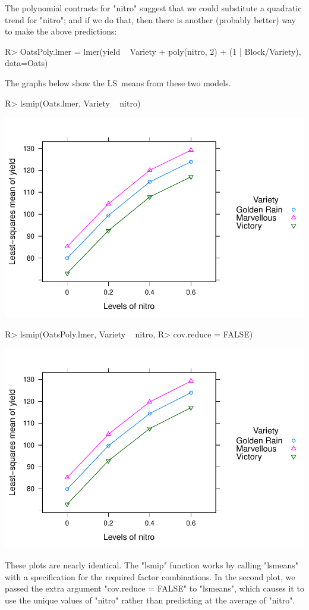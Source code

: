 \documentclass{article}
\begin{document}
The polynomial contrasts for "nitro" suggest that we could substitute a quadratic trend for "nitro"; and if we do that, then there is another (probably better) way to make the above predictions:
\begin{Winput}
R> OatsPoly.lmer = lmer(yield ~ Variety + poly(nitro, 2) + (1 | Block/Variety), data=Oats)
\end{Winput}
The graphs below show the LS~means from these two models.
\begin{multicols}{2}
\begin{Winput}
R> lsmip(Oats.lmer, Variety ~ nitro)
\end{Winput}
\includegraphics[scale=.5]{using-lsmeans-oat-add-lsmip-fig.pdf}
\begin{Winput}
R> lsmip(OatsPoly.lmer, Variety ~ nitro, 
R>     cov.reduce = FALSE)
\end{Winput}
\includegraphics[scale=.5]{using-lsmeans-oat-poly-lsmip-fig.pdf}
\end{multicols}
\noindent
These plots are nearly identical. The "lsmip" function works by calling "lsmeans" with a specification for the required factor combinations. In the second plot, we passed the extra argument "cov.reduce = FALSE" to "lsmeans", which causes it to use the unique values of "nitro" rather than predicting at the average of "nitro".
\end{document}
